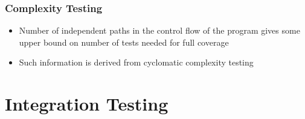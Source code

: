\documentclass{article}
\begin{document}
\subsubsection{Complexity Testing}
\begin{itemize}
    \item Number of independent paths in the control flow of the program gives some upper bound on number of tests needed for full coverage
    
    \item Such information is derived from cyclomatic complexity testing
\end{itemize}

\section{Integration Testing}
\end{document}
